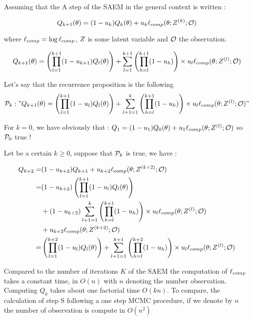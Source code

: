 \documentclass[a4paper]{article}
\begin{document}
 
\begin{myText}

Assuming that the A step of the SAEM in the general context is written : 

$$Q_{k+1} (\theta) = (1-u_k)Q_k (\theta) + u_k \logcomp(\theta; \varlat[^{(k)}];\varobs)$$

where $\logcomp = \log\logcomp$, $\varlat$ is some latent variable and $\varobs$ the observation.


\begin{prop}
    $$Q_{k+1} (\theta) = \left(\pro l1{k+1} (1-u_{k+1})Q_l (\theta)\right) + \som l1{k+1} \left(\pro hl{k+1} (1-u_h)\right) \times u_l \logcomp(\theta; \varlat[^{(l)}];\varobs)$$
\end{prop}

\begin{dem}

    Let's say that the recurrence proposition is the following
    $$\mc P_k : "Q_{k+1} (\theta) = \left(\pro l1{k+1} (1-u_l)Q_l (\theta)\right) + \som {l+1}1{k} \left(\pro hl{k+1} (1-u_h)\right) \times u_l \logcomp(\theta; \varlat[^{(l)}];\varobs)"$$ 

    For $k=0$, we have obviously that : $Q_1 = (1-u_1)Q_0(\theta) + u_1 \logcomp(\theta; \varlat[^{(l)}];\varobs) $ so $\mc P_0$ true !

    Let be a certain $k\geq 0$, suppose that $\mc P_k$ is true, we have : 

    \begin{align*}
        Q_{k+2} 
        =& (1-u_{k+2}) Q_{k+1} + u_{k+2} \logcomp(\theta; \varlat[^{(k+2)}];\varobs)
        \\
        =& (1-u_{k+2}) \left(\pro l1{k+1} (1-u_l)Q_l (\theta)\right) 
         \\ &+  (1-u_{k+2})\som {l+1}1{k} \left(\pro hl{k+1} (1-u_h)\right) \times u_l \logcomp(\theta; \varlat[^{(l)}];\varobs) 
         \\ &+ u_{k+2}\logcomp(\theta; \varlat[^{(k+2)}];\varobs)  
        \\
        =& \left(\pro l1{k+2} (1-u_l)Q_l (\theta)\right) 
         + \som {l+1}1{k+1} \left(\pro hl{k+2} (1-u_h)\right) \times u_l \logcomp(\theta; \varlat[^{(l)}];\varobs)
    \end{align*}
\end{dem}

Compared to the number of iterations $K$ of the SAEM the computation of $\logcomp$ takes a constant time, in $O(n)$ with $n$ denoting the number observation. Computing $Q_k$ takes about one factorial time $O(kn)$. To compare, the calculation of step S following a one step MCMC procedure, if we denote by $n$ the number of observation is compute in $O(n^2)$

\begin{dem}

\end{dem}






\end{myText}
\end{document}
